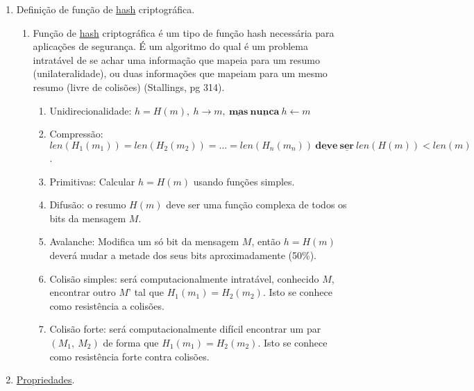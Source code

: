 \documentclass[conference]{IEEEtran}
\begin{document}
\begin{enumerate}

\item Definição de função de \underline{hash} criptográfica.

\begin{enumerate}
\item Função de \underline{hash} criptográfica é um tipo de função hash
necessária para aplicações de segurança. É um algoritmo do qual é um problema
intratável de se achar uma informação que mapeia para um resumo
(unilateralidade), ou duas informações que mapeiam para um mesmo resumo (livre
de colisões) (Stallings, pg 314).

\begin{enumerate}
\item Unidirecionalidade: $h = H(m),\ h \rightarrow m,\
\underline{\textbf{mas}}\ \underline{\textbf{nunca}}\ h \leftarrow m$

\item Compressão: $len(H_1(m_1)) = len(H_2(m_2)) = \ldots = len(H_n(m_n))\
\underline{\textbf{deve}}\ \underline{\textbf{ser}}\ len(H(m)) < 
len(m)$.

\item Primitivas: Calcular $h = H(m)$ usando funções simples.

\item Difusão: o resumo $H(m)$ deve ser uma função complexa de todos os bits da
mensagem $M$.

\item Avalanche: Modifica um só bit da mensagem $M$, então $h = H(m)$ deverá
mudar a metade dos seus bits aproximadamente (50\%).

\item Colisão simples: será computacionalmente intratável, conhecido $M$,
encontrar outro $M’$ tal que $H_1(m_1) = H_2(m_2)$. Isto se conhece como
resistência a colisões.

\item Colisão forte: será computacionalmente difícil encontrar um par $(M_1,\
M_2)$ de forma que $H_1(m_1) = H_2(m_2)$. Isto se conhece como resistência forte
contra colisões.
\end{enumerate}

\end{enumerate}

\item \underline{Propriedades}.

\begin{enumerate}


\end{enumerate}
\end{enumerate}
\end{document}
